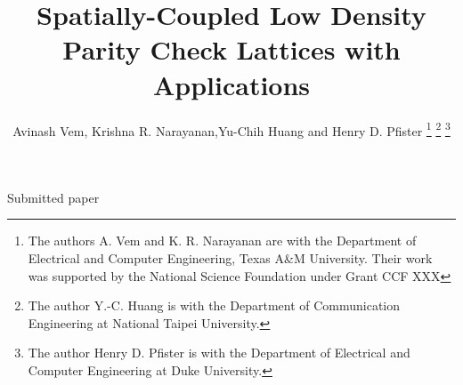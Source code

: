 \documentclass[journal,draftcls,onecolumn,12pt,twoside]{IEEEtran}
\begin{document}
%
\title{Spatially-Coupled Low Density Parity Check Lattices with Applications}


%

\author{Avinash Vem, Krishna R. Narayanan,Yu-Chih Huang and Henry D. Pfister%
\thanks{The authors A. Vem and K. R. Narayanan are with the Department of Electrical and Computer Engineering,  Texas A\&M University. Their work was supported by the National Science Foundation under Grant CCF XXX}%
\thanks{The author Y.-C. Huang is with the Department of Communication Engineering at National Taipei University.}
\thanks{The author Henry D. Pfister is with the Department of Electrical and Computer Engineering at Duke University.}
}

% 
%



%
{Submitted paper}
% 
\end{document}
